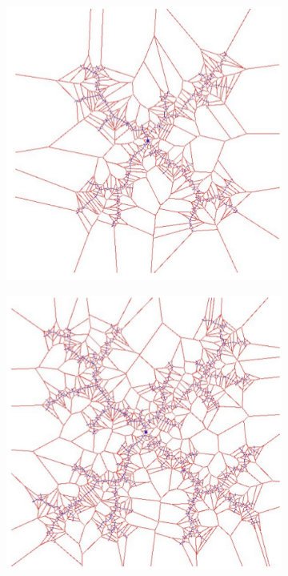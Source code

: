 \begin{figure}[h!]
\begin{subfigure}{.3\textwidth}
	\end{subfigure}
	\begin{subfigure}{.3\textwidth}
		\includegraphics[width=\textwidth]{figures/ch04_voron3.png}
	\end{subfigure}
	\begin{subfigure}{.3\textwidth}
		\includegraphics[width=\textwidth]{figures/ch04_voron4.png}

\end{subfigure}
\end{figure}
